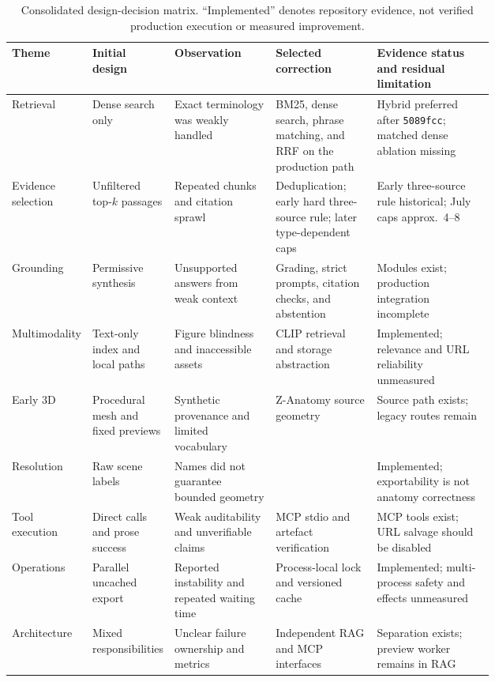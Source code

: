 \begin{landscape}
\tiny
\setlength{\tabcolsep}{2.5pt}
\renewcommand{\arraystretch}{0.72}
\begin{table}[p]
\centering
\caption{Consolidated design-decision matrix. ``Implemented'' denotes repository evidence, not verified production execution or measured improvement.}
\label{tab:decision-matrix}
\begin{tabularx}{\linewidth}{L{0.12\linewidth}L{0.17\linewidth}L{0.21\linewidth}L{0.21\linewidth}Y}
\toprule
Theme & Initial design & Observation & Selected correction & Evidence status and residual limitation \\
\midrule
Retrieval & Dense search only & Exact terminology was weakly handled & BM25, dense search, phrase matching, and RRF on the production path & Hybrid preferred after \texttt{5089fcc}; matched dense ablation missing \\
Evidence selection & Unfiltered top-$k$ passages & Repeated chunks and citation sprawl & Deduplication; early hard three-source rule; later type-dependent caps & Early three-source rule historical; July caps approx.\ 4--8 \\
Grounding & Permissive synthesis & Unsupported answers from weak context & Grading, strict prompts, citation checks, and abstention & Modules exist; production integration incomplete \\
Multimodality & Text-only index and local paths & Figure blindness and inaccessible assets & CLIP retrieval and storage abstraction & Implemented; relevance and URL reliability unmeasured \\
Early 3D & Procedural mesh and fixed previews & Synthetic provenance and limited vocabulary & Z-Anatomy source geometry & Source path exists; legacy routes remain \\
Resolution & Raw scene labels & Names did not guarantee bounded geometry &  & Implemented; exportability is not anatomy correctness \\
Tool execution & Direct calls and prose success & Weak auditability and unverifiable claims & MCP stdio and artefact verification & MCP tools exist; URL salvage should be disabled \\
Operations & Parallel uncached export & Reported instability and repeated waiting time & Process-local lock and versioned cache & Implemented; multi-process safety and effects unmeasured \\
Architecture & Mixed responsibilities & Unclear failure ownership and metrics & Independent RAG and MCP interfaces & Separation exists; preview worker remains in RAG \\
\bottomrule
\end{tabularx}
\end{table}
\renewcommand{\arraystretch}{1.0}
\normalsize
\end{landscape}


